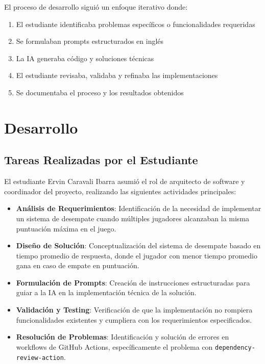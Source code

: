 \documentclass[12pt,a4paper]{article}
\begin{document}
El proceso de desarrollo siguió un enfoque iterativo donde:
\begin{enumerate}
    \item El estudiante identificaba problemas específicos o funcionalidades requeridas
    \item Se formulaban prompts estructurados en inglés
    \item La IA generaba código y soluciones técnicas
    \item El estudiante revisaba, validaba y refinaba las implementaciones
    \item Se documentaba el proceso y los resultados obtenidos
\end{enumerate}

\section{Desarrollo}

\subsection{Tareas Realizadas por el Estudiante}

El estudiante Ervin Caravali Ibarra asumió el rol de arquitecto de software y coordinador del proyecto, realizando las siguientes actividades principales:

\begin{itemize}
    \item \textbf{Análisis de Requerimientos}: Identificación de la necesidad de implementar un sistema de desempate cuando múltiples jugadores alcanzaban la misma puntuación máxima en el juego.
    
    \item \textbf{Diseño de Solución}: Conceptualización del sistema de desempate basado en tiempo promedio de respuesta, donde el jugador con menor tiempo promedio gana en caso de empate en puntuación.
    
    \item \textbf{Formulación de Prompts}: Creación de instrucciones estructuradas para guiar a la IA en la implementación técnica de la solución.
    
    \item \textbf{Validación y Testing}: Verificación de que la implementación no rompiera funcionalidades existentes y cumpliera con los requerimientos especificados.
    
    \item \textbf{Resolución de Problemas}: Identificación y solución de errores en workflows de GitHub Actions, específicamente el problema con \texttt{dependency-review-action}.
\end{itemize}
\end{document}
